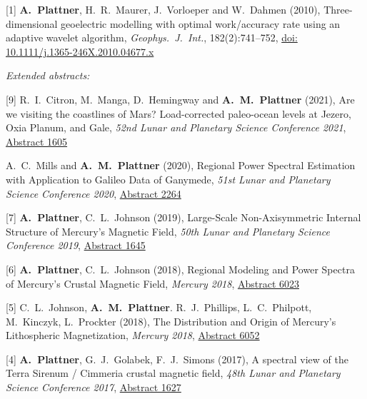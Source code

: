 \documentclass[10pt]{article}
\begin{document}
\spcp
\hspace{-0.5cm}[1] \textbf{A.~Plattner}, H.~R.~Maurer, J.~Vorloeper and W.~Dahmen (2010),
Three-dimensional geoelectric modelling with optimal work/accuracy rate 
using an adaptive wavelet algorithm,
\emph{Geophys.~J.~Int.}, 182(2):741--752,
\href{https://academic.oup.com/gji/article-lookup/doi/10.1111/j.1365-246X.2010.04677.x}{doi: 10.1111/j.1365-246X.2010.04677.x}

\spc
\emph{Extended abstracts:}

\spcp
\hspace{-0.5cm}[9] R.~I.~Citron, M.~Manga, D.~Hemingway and \textbf{A.~M.~Plattner} (2021),
Are we visiting the coastlines of Mars? Load-corrected paleo-ocean levels at Jezero, Oxia Planum, and Gale,
\emph{52nd Lunar and Planetary Science Conference 2021},
\href{https://www.hou.usra.edu/meetings/lpsc2021/pdf/1605.pdf}{Abstract 1605}

\spcp
\hspace{-0.77cm} \gr[8] A.~C.~Mills and \textbf{A.~M.~Plattner}
(2020),
Regional Power Spectral Estimation with Application to Galileo Data of Ganymede,
\emph{51st Lunar and Planetary Science Conference 2020},
\href{https://www.hou.usra.edu/meetings/lpsc2020/pdf/2264.pdf}{Abstract 2264}

\spcp
\hspace{-0.5cm}[7] \textbf{A.~Plattner}, C.~L.~Johnson (2019), Large-Scale Non-Axisymmetric Internal Structure of Mercury's Magnetic Field,
\emph{50th Lunar and Planetary Science Conference 2019},
\href{https://www.hou.usra.edu/meetings/lpsc2019/pdf/1645.pdf}{Abstract 1645}


\spcp
\hspace{-0.5cm}[6] \textbf{A.~Plattner}, C.~L.~Johnson (2018),
Regional Modeling and Power Spectra of Mercury's Crustal Magnetic Field,
\emph{Mercury 2018},
\href{https://www.hou.usra.edu/meetings/mercury2018/pdf/6023.pdf}{Abstract 6023}

\spcp
\hspace{-0.5cm}[5] C.~L.~Johnson,
\textbf{A.~M.~Plattner}. R.~J.~Phillips, L.~C.~Philpott, M.~Kinczyk,
L.~Prockter (2018), The Distribution and Origin of Mercury's Lithospheric Magnetization, \emph{Mercury 2018},
\href{https://www.hou.usra.edu/meetings/mercury2018/pdf/6052.pdf}{Abstract
  6052}

\spcp
\hspace{-0.5cm}[4] \textbf{A.~Plattner}, G.~J.~Golabek, F.~J.~Simons (2017),
A spectral view of the Terra Sirenum / Cimmeria crustal magnetic
field,
\emph{48th Lunar and Planetary Science Conference 2017},
\href{http://www.lpi.usra.edu/meetings/lpsc2017/pdf/1627.pdf}{Abstract 1627}
\end{document}
